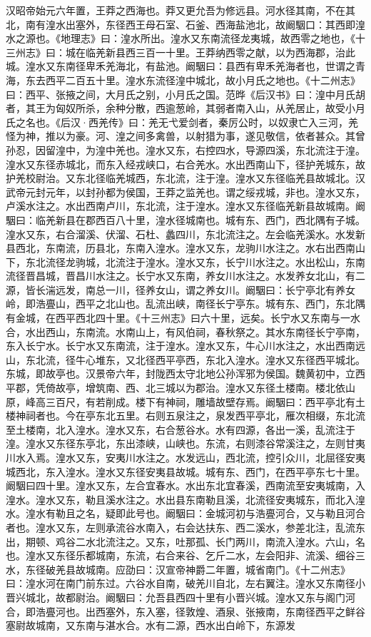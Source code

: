 \documentclass[12pt,UTF8]{ctexbook}
\begin{document}
汉昭帝始元六年置，王莽之西海也。莽又更允吾为修远县。河水径其南，不在其北，南有湟水出塞外，东径西王母石室、石釜、西海盐池北，故阚駰口：其西即湟水之源也。《地理志》曰：湟水所出。湟水又东南流径龙夷城，故西零之地也，《十三州志》曰：城在临羌新县西三百一十里。王莽纳西零之献，以为西海郡，治此城。湟水又东南径卑禾羌海北，有盐池。阚駰曰：县西有卑禾羌海者也，世谓之青海，东去西平二百五十里。湟水东流径湟中城北，故小月氏之地也。《十二州志》曰：西平、张掖之间，大月氏之别，小月氏之国。范晔《后汉书》曰：湟中月氏胡者，其王为匈奴所杀，余种分散，西逾葱岭，其弱者南入山，从羌居止，故受小月氏之名也。《后汉·西羌传》曰：羌无弋爱剑者，秦厉公时，以奴隶亡入三河，羌怪为神，推以为豪。河、湟之间多禽兽，以射猎为事，遂见敬信，依者甚众。其曾孙忍，因留湟中，为湟中羌也。湟水又东，右控四水，导源四溪，东北流注于湟。湟水又东径赤城北，而东入经戎峡口，右合羌水。水出西南山下，径护羌城东，故护羌校尉治。又东北径临羌城西，东北流，注于湟。湟水又东径临羌县故城北。汉武帝元封元年，以封孙都为侯国，王莽之监羌也。谓之绥戎城，非也。湟水又东，卢溪水注之。水出西南卢川，东北流，注于湟水。湟水又东径临羌新县故城南。阚駰曰：临羌新县在郡西百八十里，湟水径城南也。城有东、西门，西北隅有子城。湟水又东，右合溜溪、伏溜、石杜、蠡四川，东北流注之。左会临羌溪水。水发新县西北，东南流，历县北，东南入湟水。湟水又东，龙驹川水注之。水右出西南山下，东北流径龙驹城，北流注于湟水。湟水又东，长宁川水注之。水出松山，东南流径晋昌城，晋昌川水注之。长宁水又东南，养女川水注之。水发养女北山，有二源，皆长湍远发，南总一川，径养女山，谓之养女川。阚駰曰：长宁亭北有养女岭，即浩亹山，西平之北山也。乱流出峡，南径长宁亭东。城有东、西门，东北隅有金城，在西平西北四十里。《十三州志》曰六十里，远矣。长宁水又东南与一水合，水出西山，东南流。水南山上，有风伯祠，春秋祭之。其水东南径长宁亭南，东入长宁水。长宁水又东南流，注于湟水。湟水又东，牛心川水注之，水出西南远山，东北流，径牛心堆东，又北径西平亭西，东北入湟水。湟水又东径西平城北。东城，即故亭也。汉景帝六年，封陇西太守北地公孙浑邪为侯国。魏黄初中，立西平郡，凭倚故亭，增筑南、西、北三城以为郡治。湟水又东径土楼南。楼北依山原，峰高三百尺，有若削成。楼下有神祠，雕墙故壁存焉。阚駰曰：西平亭北有土楼神祠者也。今在亭东北五里。右则五泉注之，泉发西平亭北，雁次相缀，东北流至土楼南，北入湟水。湟水又东，右合葱谷水。水有四源，各出一溪，乱流注于湟。湟水又东径东亭北，东出漆峡，山峡也。东流，右则漆谷常溪注之，左则甘夷川水入焉。湟水又东，安夷川水注之。水发远山，西北流，控引众川，北屈径安夷城西北，东入湟水。湟水又东径安夷县故城。城有东、西门，在西平亭东七十里。阚駰曰四十里。湟水又东，左合宜春水。水出东北宜春溪，西南流至安夷城南，入湟水。湟水又东，勒且溪水注之。水出县东南勒且溪，北流径安夷城东，而北入湟水。湟水有勒且之名，疑即此号也。阚駰曰：金城河初与浩亹河合，又与勒且河合者也。湟水又东，左则承流谷水南入，右会达扶东、西二溪水，参差北注，乱流东出，期顿、鸡谷二水北流注之。又东，吐那孤、长门两川，南流入湟水。六山，名也。湟水又东径乐都城南，东流，右合来谷、乞斤二水，左会阳非、流溪、细谷三水，东径破羌县故城南。应劭曰：汉宣帝神爵二年置，城省南门。《十二州志》曰：湟水河在南门前东过。六谷水自南，破羌川自北，左右翼注。湟水又东南径小晋兴城北，故都尉治。阚駰曰：允吾县西四十里有小晋兴城。湟水又东与阁门河合，即浩亹河也。出西塞外，东入塞，径敦煌、酒泉、张掖南，东南径西平之鲜谷塞尉故城南，又东南与湛水合。水有二源，西水出白岭下，东源发
\end{document}
